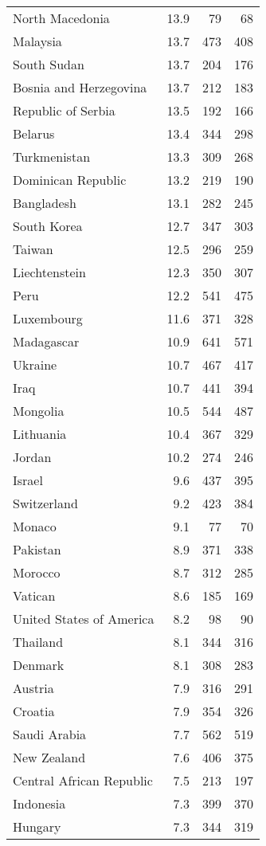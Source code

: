 \begin{table}[htbp]
\begin{tabular}{lrrr}
North Macedonia & 13.9 & 79 & 68 \\
Malaysia & 13.7 & 473 & 408 \\
South Sudan & 13.7 & 204 & 176 \\
Bosnia and Herzegovina & 13.7 & 212 & 183 \\
Republic of Serbia & 13.5 & 192 & 166 \\
Belarus & 13.4 & 344 & 298 \\
Turkmenistan & 13.3 & 309 & 268 \\
Dominican Republic & 13.2 & 219 & 190 \\
Bangladesh & 13.1 & 282 & 245 \\
South Korea & 12.7 & 347 & 303 \\
Taiwan & 12.5 & 296 & 259 \\
Liechtenstein & 12.3 & 350 & 307 \\
Peru & 12.2 & 541 & 475 \\
Luxembourg & 11.6 & 371 & 328 \\
Madagascar & 10.9 & 641 & 571 \\
Ukraine & 10.7 & 467 & 417 \\
Iraq & 10.7 & 441 & 394 \\
Mongolia & 10.5 & 544 & 487 \\
Lithuania & 10.4 & 367 & 329 \\
Jordan & 10.2 & 274 & 246 \\
Israel & 9.6 & 437 & 395 \\
Switzerland & 9.2 & 423 & 384 \\
Monaco & 9.1 & 77 & 70 \\
Pakistan & 8.9 & 371 & 338 \\
Morocco & 8.7 & 312 & 285 \\
Vatican & 8.6 & 185 & 169 \\
United States of America & 8.2 & 98 & 90 \\
Thailand & 8.1 & 344 & 316 \\
Denmark & 8.1 & 308 & 283 \\
Austria & 7.9 & 316 & 291 \\
Croatia & 7.9 & 354 & 326 \\
Saudi Arabia & 7.7 & 562 & 519 \\
New Zealand & 7.6 & 406 & 375 \\
Central African Republic & 7.5 & 213 & 197 \\
Indonesia & 7.3 & 399 & 370 \\
Hungary & 7.3 & 344 & 319 \\

\end{tabular}
\end{table}
